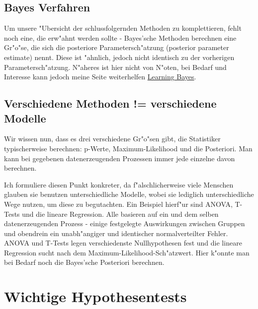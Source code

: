 \documentclass[a4paper,twoside]{tufte-book}\usepackage[]{graphicx}\usepackage[]{color}
\begin{document}
\subsection{Bayes Verfahren}

Um unsere "Ubersicht der schlussfolgernden Methoden zu komplettieren, fehlt noch eine, die erw"ahnt werden sollte - Bayes'sche Methoden berechnen eine Gr"o"se, die sich die posteriore Parametersch"atzung (posterior parameter estimate) nennt. Diese ist "ahnlich, jedoch nicht identisch zu der vorherigen Parametersch"atzung. N"aheres ist hier nicht von N"oten, bei Bedarf und Interesse kann jedoch meine Seite weiterhelfen \citep{Gelman-BayesianDataAnalysis-2003} \href{http://florianhartig.github.io/LearningBayes/}{Learning Bayes}.

\subsection{Verschiedene Methoden != verschiedene Modelle}

Wir wissen nun, dass es drei verschiedene Gr"o"sen gibt, die Statistiker typischerweise berechnen: p-Werte, Maximum-Likelihood und die Posteriori. Man kann bei gegebenen datenerzeugenden Prozessen immer jede einzelne davon berechnen.

Ich formuliere diesen Punkt konkreter, da f"alschlicherweise viele Menschen glauben sie benutzen unterschiedliche Modelle, wobei sie lediglich unterschiedliche Wege nutzen, um diese zu begutachten. Ein Beispiel hierf"ur sind ANOVA, T-Tests und die lineare Regression. Alle basieren auf ein und dem selben datenerzeugenden Prozess - einige festgelegte Auswirkungen zwischen Gruppen und obendrein ein unabh"angiger und identischer normalverteilter Fehler. ANOVA und T-Tests legen verschiedenste Nullhypothesen fest und die lineare Regression sucht nach dem Maximum-Likelihood-Sch"atzwert. Hier k"onnte man bei Bedarf noch die Bayes'sche Posteriori berechnen. 

\section{Wichtige Hypothesentests}
\end{document}
